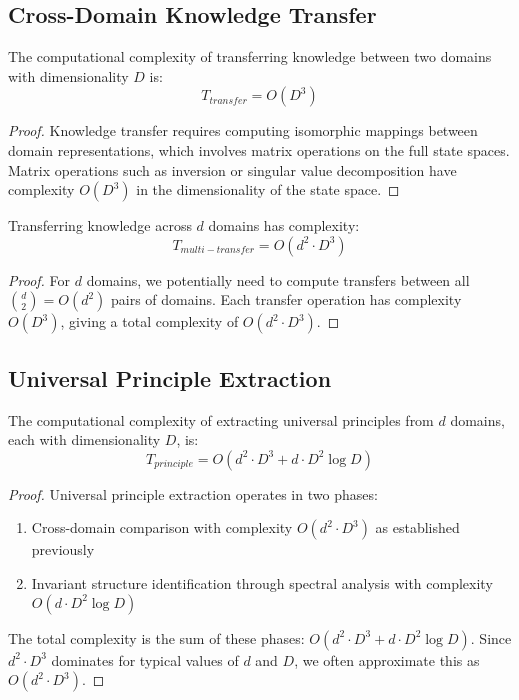 \subsection{Cross-Domain Knowledge Transfer}

\begin{theorem}
The computational complexity of transferring knowledge between two domains with dimensionality $D$ is:
\begin{equation}
T_{transfer} = O(D^3)
\end{equation}
\end{theorem}

\begin{proof}
Knowledge transfer requires computing isomorphic mappings between domain representations, which involves matrix operations on the full state spaces. Matrix operations such as inversion or singular value decomposition have complexity $O(D^3)$ in the dimensionality of the state space.
\end{proof}

\begin{theorem}
Transferring knowledge across $d$ domains has complexity:
\begin{equation}
T_{multi-transfer} = O(d^2 \cdot D^3)
\end{equation}
\end{theorem}

\begin{proof}
For $d$ domains, we potentially need to compute transfers between all $\binom{d}{2} = O(d^2)$ pairs of domains. Each transfer operation has complexity $O(D^3)$, giving a total complexity of $O(d^2 \cdot D^3)$.
\end{proof}

\subsection{Universal Principle Extraction}

\begin{theorem}
The computational complexity of extracting universal principles from $d$ domains, each with dimensionality $D$, is:
\begin{equation}
T_{principle} = O(d^2 \cdot D^3 + d \cdot D^2 \log D)
\end{equation}
\end{theorem}

\begin{proof}
Universal principle extraction operates in two phases:
\begin{enumerate}
    \item Cross-domain comparison with complexity $O(d^2 \cdot D^3)$ as established previously
    \item Invariant structure identification through spectral analysis with complexity $O(d \cdot D^2 \log D)$
\end{enumerate}
The total complexity is the sum of these phases: $O(d^2 \cdot D^3 + d \cdot D^2 \log D)$. Since $d^2 \cdot D^3$ dominates for typical values of $d$ and $D$, we often approximate this as $O(d^2 \cdot D^3)$.
\end{proof}

